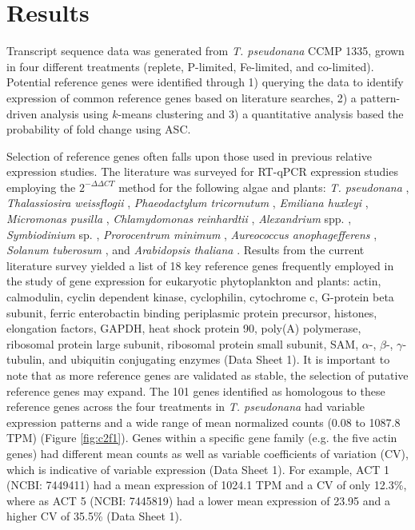 \section{Results}
Transcript sequence data was generated from \textit{T. pseudonana} CCMP 1335, grown in four different treatments (replete, P-limited, Fe-limited, and co-limited). Potential reference genes were identified through 1) querying the data to identify expression of common reference genes based on literature searches, 2) a pattern-driven analysis using $k$-means clustering \citep{Hartigan1979} and 3) a quantitative analysis based the probability of fold change using ASC. \par
Selection of reference genes often falls upon those used in previous relative expression studies. The literature was surveyed for RT-qPCR expression studies employing the $2^{- \Delta \Delta CT}$ method for the following algae and plants: \textit{T. pseudonana} \citep{Maldonado2006, McGinn2008, McGinn2008a, Mock2008, Park2008, Carvalho2011, Whitney2011a}, \textit{Thalassiosira weissflogii} \citep{Davis2006, McGinn2008, Park2008, Whitney2011a}, \textit{Phaeodactylum tricornutum} \citep{Siaut2007, McGinn2008}, \textit{Emiliana huxleyi} \citep{Bruhn2010, Richier2010}, \textit{Micromonas pusilla} \citep{McDonald2010}, \textit{Chlamydomonas reinhardtii} \citep{Moseley2006, Zhao2009}, \textit{Alexandrium} spp. \citep{Lee2009, Moustafa2010}, \textit{Symbiodinium} sp. \citep{Rosic2010, Rosic2010a, Leggat2011}, \textit{Prorocentrum minimum} \citep{Guo2012}, \textit{Aureococcus anophagefferens} \citep{Berg2008, Wurch2011}, \textit{Solanum tuberosum} \citep{Nicot2005}, and \textit{Arabidopsis thaliana} \citep{Avonce2004}. Results from the current literature survey yielded a list of 18 key reference genes frequently employed in the study of gene expression for eukaryotic phytoplankton and plants: actin, calmodulin, cyclin dependent kinase, cyclophilin, cytochrome c, G-protein beta subunit, ferric enterobactin binding periplasmic protein precursor, histones, elongation factors, GAPDH, heat shock protein 90, poly(A) polymerase, ribosomal protein large subunit, ribosomal protein small subunit, SAM, $\alpha$-, $\beta$-, $\gamma$-tubulin, and ubiquitin conjugating enzymes (Data Sheet 1). It is important to note that as more reference genes are validated as stable, the selection of putative reference genes may expand. The 101 genes identified as homologous to these reference genes across the four treatments in \textit{T. pseudonana} had variable expression patterns and a wide range of mean normalized counts (0.08 to 1087.8 TPM) (Figure \ref{fig:c2f1}). Genes within a specific gene family (e.g. the five actin genes) had different mean counts as well as variable coefficients of variation (CV), which is indicative of variable expression (Data Sheet 1). For example, ACT 1 (NCBI: 7449411) had a mean expression of 1024.1 TPM and a CV of only 12.3\%, where as ACT 5 (NCBI: 7445819) had a lower mean expression of 23.95 and a higher CV of 35.5\% (Data Sheet 1). \par

